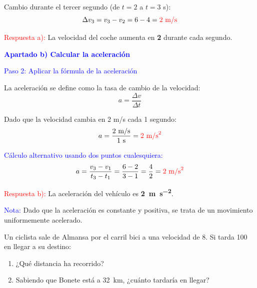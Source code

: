 \begin{exercise}
\begin{solu}
        Cambio durante el tercer segundo (de $t=2$ a $t=3$ s):
        \[
            \Delta v_3 = v_3 - v_2 = 6 - 4 = \textcolor{red}{2 \text{ m/s}}
        \]

        \textcolor{red}{Respuesta a):} La velocidad del coche aumenta en \textbf{\qty{2}{\mps}} durante cada segundo.

        \vspace{0.5cm}

        \textbf{\textcolor{blue}{Apartado b) Calcular la aceleración}}

        \textcolor{blue}{Paso 2: Aplicar la fórmula de la aceleración}

        La aceleración se define como la tasa de cambio de la velocidad:
        \[
            \boxed{a = \frac{\Delta v}{\Delta t}}
        \]

        Dado que la velocidad cambia en 2 m/s cada 1 segundo:
        \[
            a = \frac{2 \text{ m/s}}{1 \text{ s}} = \textcolor{red}{2 \text{ m/s}^2}
        \]

        \textcolor{blue}{Cálculo alternativo usando dos puntos cualesquiera:}
        \[
            a = \frac{v_3 - v_1}{t_3 - t_1} = \frac{6 - 2}{3 - 1} = \frac{4}{2} = \textcolor{red}{2 \text{ m/s}^2}
        \]

        \textcolor{red}{Respuesta b):} La aceleración del vehículo es \textbf{\qty{2}{\metre\per\second\squared}}.

        \textcolor{blue}{Nota:} Dado que la aceleración es constante y positiva, se trata de un movimiento uniformemente acelerado.
    \end{solu}
\end{exercise}

\begin{exercise}
    Un ciclista sale de Almansa por el carril bici a una velocidad de \qty{8}{\mps}.
    Si tarda \qty{100}{\min} en llegar a su destino:
    \begin{enumerate}[label=\letraminuscula]
    \item ¿Qué distancia ha recorrido?
    \item Sabiendo que Bonete está a \qty{32}{\km}, ¿cuánto tardaría en llegar?
    \end{enumerate}
\end{exercise}

